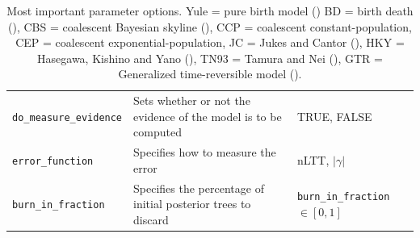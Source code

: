 \begin{table}
\begin{tabular}{|p{3.4cm}|p{9.7cm}|p{4.5cm}@{}|}
    \verb;do_measure_evidence; &
    Sets whether or not the evidence of the model is to be computed &
    TRUE, FALSE \\
    \verb;error_function; &
    Specifies how to measure the error &
    nLTT, $|\gamma|$ \\
    \verb;burn_in_fraction; &
    Specifies the percentage of initial posterior trees to discard &
    \verb;burn_in_fraction; $\in [0, 1]$\\
    \hline
  \end{tabular}
  \caption{
    Most important parameter options.
    Yule = pure birth model (\cite{yule})
    BD = birth death (\cite{nee1994reconstructed}), 
    CBS = coalescent Bayesian skyline (\cite{drummond2005bayesian}), 
    CCP = coalescent constant-population, 
    CEP = coalescent exponential-population,
    JC = Jukes and Cantor (\cite{jukes1969evolution}), 
    HKY = Hasegawa, Kishino and Yano (\cite{hasegawa1985dating}), 
    TN93 = Tamura and Nei (\cite{tamura1993estimation}), 
    GTR = Generalized time-reversible model (\cite{tavare1986some}).
  }
  \label{tab:options}
\bigskip


\end{table}
